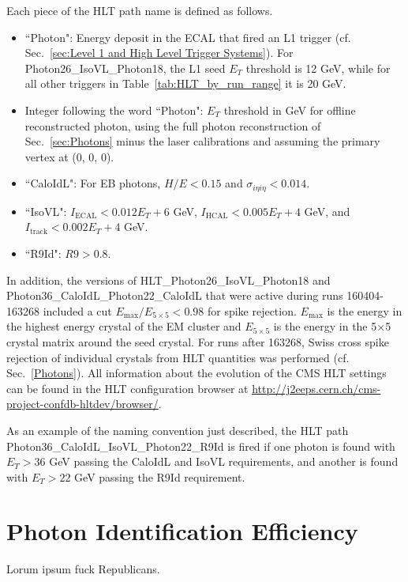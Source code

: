 \documentclass[dissertation.tex]{subfiles}
\begin{document}
Each piece of the HLT path name is defined as follows.

\begin{itemize}
\item ``Photon": Energy deposit in the ECAL that fired an L1 trigger (cf. Sec.~\ref{sec:Level 1 and High Level Trigger Systems}).  For Photon26\_IsoVL\_Photon18, the L1 seed $E_{T}$ threshold is 12 GeV, while for all other triggers in Table~\ref{tab:HLT_by_run_range} it is 20 GeV.  %
\item Integer following the word ``Photon": $E_{T}$ threshold in GeV for offline reconstructed photon, using the full photon reconstruction of Sec.~\ref{sec:Photons} minus the laser calibrations and assuming the primary vertex at (0, 0, 0).
\item ``CaloIdL": For EB photons, $H/E < 0.15$ and $\sigma_{i\eta i\eta} < 0.014$.
\item ``IsoVL": $I_{\mathrm{ECAL}} < 0.012E_{T} + 6$ GeV, $I_{\mathrm{HCAL}} < 0.005E_{T} + 4$ GeV, and $I_{\mathrm{track}} < 0.002E_{T} + 4$ GeV.
\item ``R9Id": $R9 > 0.8$.
\end{itemize}
%
In addition, the versions of HLT\_Photon26\_IsoVL\_Photon18 and \\Photon36\_CaloIdL\_Photon22\_CaloIdL that were active during runs 160404-163268 included a cut $E_{\mathrm{max}}/E_{5\times 5} < 0.98$ for spike rejection.  $E_{\mathrm{max}}$ is the energy in the highest energy crystal of the EM cluster and $E_{5\times 5}$ is the energy in the 5$\times$5 crystal matrix around the seed crystal.  For runs after 163268, Swiss cross spike rejection of individual crystals from HLT quantities was performed (cf. Sec.~\ref{Photons}).  All information about the evolution of the CMS HLT settings can be found in the HLT configuration browser at \url{http://j2eeps.cern.ch/cms-project-confdb-hltdev/browser/}.

As an example of the naming convention just described, the HLT path Photon36\_CaloIdL\_IsoVL\_Photon22\_R9Id is fired if one photon is found with $E_{T} > 36$ GeV passing the CaloIdL and IsoVL requirements, and another is found with $E_{T} > 22$ GeV passing the R9Id requirement.

\section{Photon Identification Efficiency}
\label{sec:Photon Identification Efficiency}

Lorum ipsum fuck Republicans.
\end{document}
